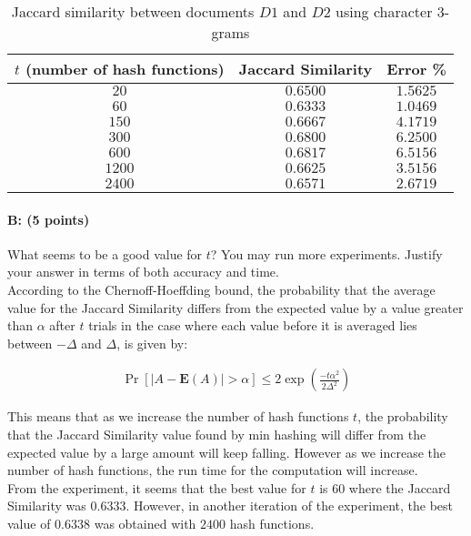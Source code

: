 \documentclass[11pt]{article}
\begin{document}
    \begin{table}[!h] 
    \centering
  \caption{Jaccard similarity between documents $D1$ and $D2$ using character $3$-grams}
    \begin{tabular}{|c|c|c|}
      \hline
   $t$ (number of hash functions)  & Jaccard Similarity  & Error \% \\
      \hline      
      $20$ &   $0.6500$  &   $1.5625$   \\
      \hline      
      $60$ &    $0.6333$  & $1.0469$ \\
      \hline      
      $150$ &    $0.6667$  &  $4.1719$\\
      \hline      
      $300$ &      $0.6800$  &   $6.2500$\\
      \hline
      $600$ &      $0.6817$    & $6.5156$\\
      \hline
      $1200$ &      $0.6625$    & $3.5156$\\
        \hline
      $2400$ &      $0.6571$    & $2.6719$\\
    \hline
    \end{tabular}
    \end{table}
    
\paragraph{B: (5 points)} 
What seems to be a good value for $t$? You may run more experiments. Justify your answer in terms of both accuracy and time.\\

According to the Chernoff-Hoeffding bound, the probability that the average value for the Jaccard Similarity differs from the expected value by a value greater than $\alpha$ after $t$ trials in the case where each value before it is averaged lies between $-\Delta$ and $\Delta$, is given by: 

\begin{equation*}
\begin{aligned}
\Pr \left [ \left |A - \textbf{E} \left (A\right ) \right| > \alpha \right ] \leq 2 \exp \left ( \frac{-t \alpha^2}{2 \Delta^2} \right)
\end{aligned}
\end{equation*}

This means that as we increase the number of hash functions $t$, the probability that the Jaccard Similarity value found by min hashing will differ from the expected value by a large amount will keep falling. However as we increase the number of hash functions, the run time for the computation will increase. \\

From the experiment, it seems that the best value for $t$ is $60$ where the Jaccard Similarity was $0.6333$. However, in another iteration of the experiment, the best value of $0.6338$ was obtained with $2400$ hash functions. 
\end{document}
